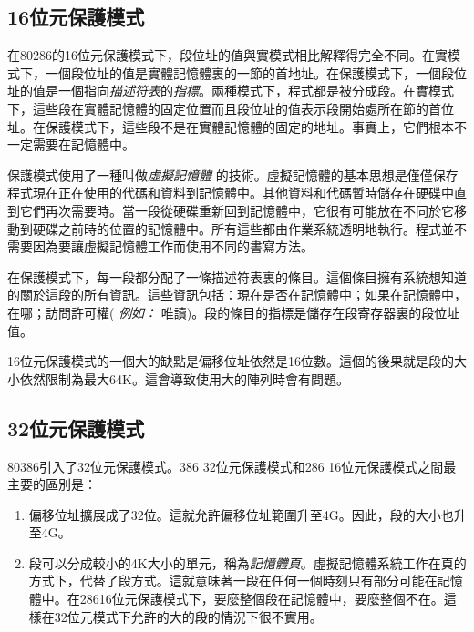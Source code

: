 \subsection{16位元保護模式 \label{16prot_mode} }

在80286的16位元保護模式下，段位址的值與實模式相比解釋得完全不同。在實模式下，一個段位址的值是實體記憶體裏的一節的首地址。在保護模式下，一個段位址的值是一個指向\emph{描述符表}的\emph{指標}。兩種模式下，程式都是被分成段。在實模式下，這些段在實體記憶體的固定位置而且段位址的值表示段開始處所在節的首位址。在保護模式下，這些段不是在實體記憶體的固定的地址。事實上，它們根本不一定需要在記憶體中。

保護模式使用了一種叫做\emph{虛擬記憶體}
的技術。虛擬記憶體的基本思想是僅僅保存程式現在正在使用的代碼和資料到記憶體中。其他資料和代碼暫時儲存在硬碟中直到它們再次需要時。當一段從硬碟重新回到記憶體中，它很有可能放在不同於它移動到硬碟之前時的位置的記憶體中。所有這些都由作業系統透明地執行。程式並不需要因為要讓虛擬記憶體工作而使用不同的書寫方法。

在保護模式下，每一段都分配了一條描述符表裏的條目。這個條目擁有系統想知道的關於這段的所有資訊。這些資訊包括：現在是否在記憶體中；如果在記憶體中，在哪；訪問許可權({\em
例如：} 唯讀)。段的條目的指標是儲存在段寄存器裏的段位址值。

16位元保護模式的一個大的缺點是偏移位址依然是16位數。這個的後果就是段的大小依然限制為最大64K。這會導致使用大的陣列時會有問題。

\subsection{32位元保護模式}

80386引入了32位元保護模式。386 32位元保護模式和286
16位元保護模式之間最主要的區別是：
\begin{enumerate}
\item

偏移位址擴展成了32位。這就允許偏移位址範圍升至4G。因此，段的大小也升至4G。

\item

段可以分成較小的4K大小的單元，稱為\emph{記憶體頁}。虛擬記憶體系統工作在頁的方式下，代替了段方式。這就意味著一段在任何一個時刻只有部分可能在記憶體中。在28616位元保護模式下，要麼整個段在記憶體中，要麼整個不在。這樣在32位元模式下允許的大的段的情況下很不實用。

\end{enumerate}

